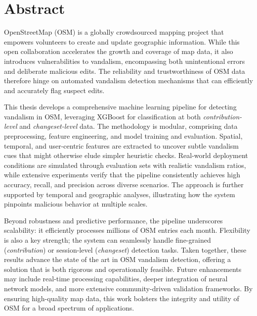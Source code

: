 \documentclass[
    13pt, %
    a4paper, %
    listof=totoc, %
    bibliography=totoc, %
    index=totoc, %
    headsepline
]{scrreprt}
\begin{document}
\newpage
\section*{\LARGE Abstract}

OpenStreetMap (OSM) is a globally crowdsourced mapping project that empowers volunteers to create and update geographic information. While this open collaboration accelerates the growth and coverage of map data, it also introduces vulnerabilities to vandalism, encompassing both unintentional errors and deliberate malicious edits. The reliability and trustworthiness of OSM data therefore hinge on automated vandalism detection mechanisms that can efficiently and accurately flag suspect edits.

This thesis develops a comprehensive machine learning pipeline for detecting vandalism in OSM, leveraging XGBoost for classification at both \emph{contribution-level} and \emph{changeset-level} data. The methodology is modular, comprising data preprocessing, feature engineering, and model training and evaluation. Spatial, temporal, and user-centric features are extracted to uncover subtle vandalism cues that might otherwise elude simpler heuristic checks. Real-world deployment conditions are simulated through evaluation sets with realistic vandalism ratios, while extensive experiments verify that the pipeline consistently achieves high accuracy, recall, and precision across diverse scenarios. The approach is further supported by temporal and geographic analyses, illustrating how the system pinpoints malicious behavior at multiple scales.

Beyond robustness and predictive performance, the pipeline underscores scalability: it efficiently processes millions of OSM entries each month. Flexibility is also a key strength; the system can seamlessly handle fine-grained (\emph{contribution}) or session-level (\emph{changeset}) detection tasks. Taken together, these results advance the state of the art in OSM vandalism detection, offering a solution that is both rigorous and operationally feasible. Future enhancements may include real-time processing capabilities, deeper integration of neural network models, and more extensive community-driven validation frameworks. By ensuring high-quality map data, this work bolsters the integrity and utility of OSM for a broad spectrum of applications.

\newpage
\tableofcontents
\newpage

\setcounter{page}{1}
\end{document}
